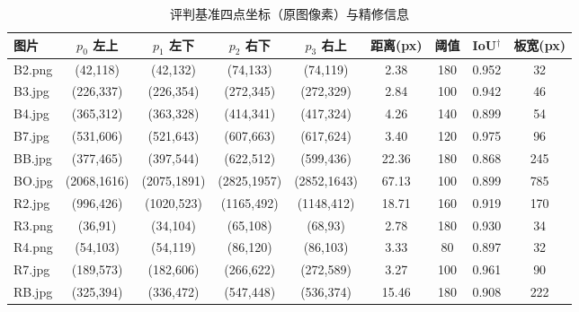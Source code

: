 \documentclass[11pt,a4paper]{ctexart}
\begin{document}
\begin{table}[htbp]
\centering\small
\caption{评判基准四点坐标（原图像素）与精修信息}\label{tab:kpt}
{\small
\begin{tabular}{@{}lcccccccc@{}}
\toprule
图片 & $p_0$ 左上 & $p_1$ 左下 & $p_2$ 右下 & $p_3$ 右上 & 距离(px) & 阈值 & IoU$^\dagger$ & 板宽(px)\\
\midrule
B2.png & (42,118) & (42,132) & (74,133) & (74,119) & 2.38 & 180 & 0.952 & 32\\
B3.jpg & (226,337) & (226,354) & (272,345) & (272,329) & 2.84 & 100 & 0.942 & 46\\
B4.jpg & (365,312) & (363,328) & (414,341) & (417,324) & 4.26 & 140 & 0.899 & 54\\
B7.jpg & (531,606) & (521,643) & (607,663) & (617,624) & 3.40 & 120 & 0.975 & 96\\
BB.jpg & (377,465) & (397,544) & (622,512) & (599,436) & 22.36 & 180 & 0.868 & 245\\
BO.jpg & (2068,1616) & (2075,1891) & (2825,1957) & (2852,1643) & 67.13 & 100 & 0.899 & 785\\
R2.jpg & (996,426) & (1020,523) & (1165,492) & (1148,412) & 18.71 & 160 & 0.919 & 170\\
R3.png & (36,91) & (34,104) & (65,108) & (68,93) & 2.78 & 180 & 0.930 & 34\\
R4.png & (54,103) & (54,119) & (86,120) & (86,103) & 3.33 & 80 & 0.897 & 32\\
R7.jpg & (189,573) & (182,606) & (266,622) & (272,589) & 3.27 & 100 & 0.961 & 90\\
RB.jpg & (325,394) & (336,472) & (547,448) & (536,374) & 15.46 & 180 & 0.908 & 222\\
\bottomrule
\end{tabular}}
\par\vspace{1mm}{\footnotesize $^\dagger$ 为精修结果与多模型共识粗框的四边形 IoU。}
\end{table}
\end{document}

